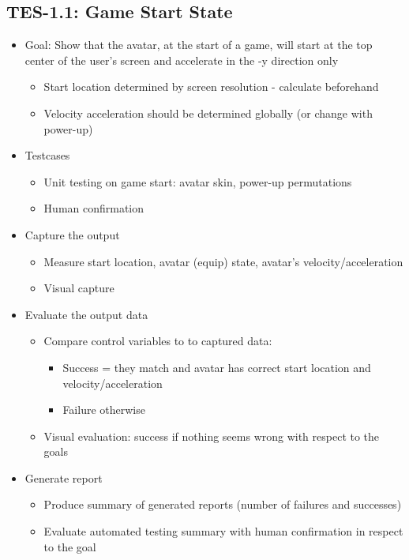 \subsection{TES-1.1: Game Start State}
\begin{itemize}
\item Goal: Show that the avatar, at the start of a game, will start at the top center of the user\textquoteright{}s screen and accelerate in the -y direction only
\begin{itemize}
\item Start location determined by screen resolution - calculate beforehand
\item Velocity acceleration should be determined globally (or change with power-up)
\end{itemize}

\item Testcases
\begin{itemize}
\item Unit testing on game start: avatar skin, power-up permutations
\item Human confirmation
\end{itemize}

\item Capture the output
\begin{itemize}
\item Measure start location, avatar (equip) state, avatar’s velocity/acceleration
\item Visual capture
\end{itemize}

\item Evaluate the output data
\begin{itemize}
\item Compare control variables to to captured data:
\begin{itemize}
\item Success = they match and avatar has correct start location and velocity/acceleration
\item Failure otherwise
\end{itemize}

\item Visual evaluation: success if nothing seems wrong with respect to the goals
\end{itemize}

\item Generate report
\begin{itemize}
\item Produce summary of generated reports (number of failures and successes)
\item Evaluate automated testing summary with human confirmation in respect to the goal
\end{itemize}
\end{itemize}

